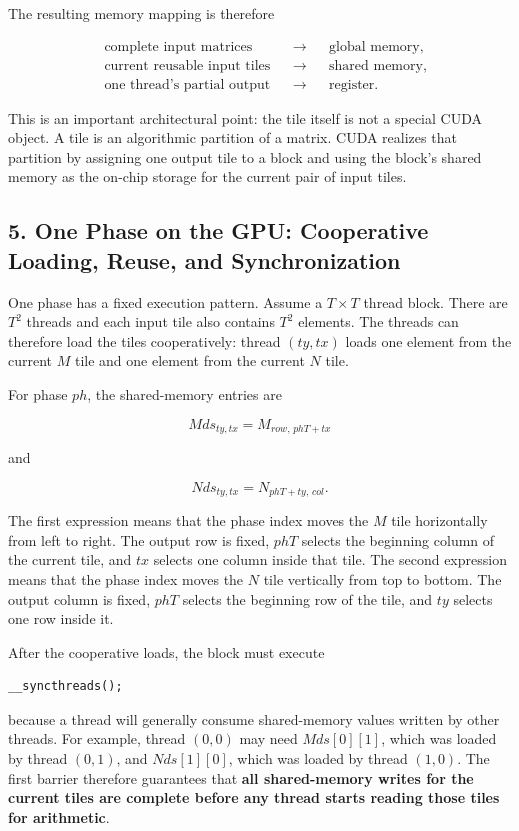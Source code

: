 \documentclass[11pt,a4paper]{article}
\begin{document}
The resulting memory mapping is therefore

\[
\begin{aligned}
&\text{complete input matrices} &&\rightarrow&& \text{global memory}, \\
&\text{current reusable input tiles} &&\rightarrow&& \text{shared memory}, \\
&\text{one thread's partial output} &&\rightarrow&& \text{register}.
\end{aligned}
\]

This is an important architectural point: the tile itself is not a special CUDA object. A tile is an algorithmic partition of a matrix. CUDA realizes that partition by assigning one output tile to a block and using the block's shared memory as the on-chip storage for the current pair of input tiles.

\subsection{5. One Phase on the GPU: Cooperative Loading, Reuse, and Synchronization}

One phase has a fixed execution pattern. Assume a $T\times T$ thread block. There are $T^2$ threads and each input tile also contains $T^2$ elements. The threads can therefore load the tiles cooperatively: thread $(ty,tx)$ loads one element from the current $M$ tile and one element from the current $N$ tile.

For phase $ph$, the shared-memory entries are

\[
\boxed{
Mds_{ty,tx}
=
M_{row,\,phT+tx}
}
\]

and

\[
\boxed{
Nds_{ty,tx}
=
N_{phT+ty,\,col}.
}
\]

The first expression means that the phase index moves the $M$ tile horizontally from left to right. The output row is fixed, $phT$ selects the beginning column of the current tile, and $tx$ selects one column inside that tile. The second expression means that the phase index moves the $N$ tile vertically from top to bottom. The output column is fixed, $phT$ selects the beginning row of the tile, and $ty$ selects one row inside it.

After the cooperative loads, the block must execute

\begin{lstlisting}
__syncthreads();
\end{lstlisting}

because a thread will generally consume shared-memory values written by other threads. For example, thread $(0,0)$ may need $Mds[0][1]$, which was loaded by thread $(0,1)$, and $Nds[1][0]$, which was loaded by thread $(1,0)$. The first barrier therefore guarantees that \textbf{all shared-memory writes for the current tiles are complete before any thread starts reading those tiles for arithmetic}.
\end{document}
